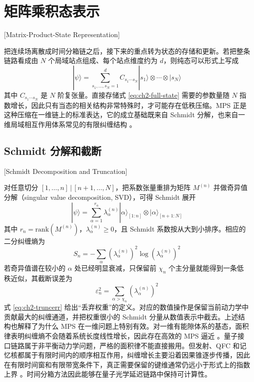 \section{矩阵乘积态表示}[Matrix-Product-State Representation]

把连续场离散成时间分箱链之后，接下来的重点转为状态的存储和更新。若把整条链路看成由 $N$ 个局域站点组成、每个站点维度约为 $d$，则纯态可以形式上写成
\begin{equation}
|\psi\rangle=
\sum_{s_1,\ldots,s_N=1}^{d}
C_{s_1\cdots s_N}
|s_1\rangle\otimes\cdots\otimes|s_N\rangle
\label{eq:ch2-full-state}
\end{equation}
其中 $C_{s_1\cdots s_N}$ 是 $N$ 阶复张量。直接存储式 \eqref{eq:ch2-full-state} 需要的参数量随 $N$ 指数增长，因此只有当态的相关结构非常特殊时，才可能存在低秩压缩。MPS 正是这种压缩在一维链上的标准表达，它的成立基础既来自 Schmidt 分解，也来自一维局域相互作用体系常见的有限纠缠结构 \cite{White1992DMRG,White1993DMRG,Vidal2003SlightlyEntangled,Schollwoeck2011MPS,Orus2014TensorNetworks}。

\subsection{Schmidt 分解和截断}[Schmidt Decomposition and Truncation]

对任意切分 $[1,\ldots,n]\,|\,[n+1,\ldots,N]$，把系数张量重排为矩阵 $M^{(n)}$ 并做奇异值分解（singular value decomposition, SVD），可得 Schmidt 展开
\begin{equation}
|\psi\rangle=
\sum_{\alpha=1}^{r_n}
\lambda_{\alpha}^{(n)}
|\alpha\rangle_{[1:n]}
\otimes
|\alpha\rangle_{[n+1:N]}
\label{eq:ch2-schmidt}
\end{equation}
其中 $r_n=\mathrm{rank}(M^{(n)})$，$\lambda_{\alpha}^{(n)}\ge 0$，且 Schmidt 系数按从大到小排序。相应的二分纠缠熵为
\begin{equation}
S_n=-\sum_{\alpha}(\lambda_{\alpha}^{(n)})^2\log (\lambda_{\alpha}^{(n)})^2
\label{eq:ch2-entanglement-entropy}
\end{equation}
若奇异值谱在较小的 $\alpha$ 处已经明显衰减，只保留前 $\chi_n$ 个主分量就能得到一条低秩近似，其截断误差为
\begin{equation}
\varepsilon_n^2=\sum_{\alpha>\chi_n}(\lambda_{\alpha}^{(n)})^2
\label{eq:ch2-truncerr}
\end{equation}
式 \eqref{eq:ch2-truncerr} 给出“丢弃权重”的定义。对应的数值操作是保留当前动力学中贡献最大的纠缠通道，并把权重很小的 Schmidt 分量从数值表示中截去。上述结构也解释了为什么 MPS 在一维问题上特别有效。对一维有能隙体系的基态，面积律表明纠缠熵不会随着系统长度线性增长，因此存在高效的 MPS 逼近 \cite{Hastings2007AreaLaw}。量子接口链路属于非平衡动力学问题，严格的面积律不能直接搬用。但发射、QFC 和记忆核都属于有限时间内的顺序相互作用，纠缠增长主要沿着因果锥逐步传播，因此在有限时间窗和有限带宽条件下，真正需要保留的键维通常仍远小于形式上的指数上界 \cite{Vidal2003SlightlyEntangled,Vidal2004TEBD,Pichler2016TimeDelaysMPS}。时间分箱方法因此能够在量子光学延迟链路中保持可计算性。

